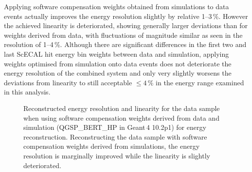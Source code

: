 \documentclass[twoside,a4paper,12pt]{article}
\begin{document}
Applying software compensation weights obtained from simulations to data events actually improves the energy resolution slightly by relative 1--3\,\%. However the achieved linearity is deteriorated, showing generally larger deviations than for weights derived from data, with fluctuations of magnitude similar as seen in the resolution of 1--4\,\%. Although there are significant differences in the first two and last ScECAL hit energy bin weights between data and simulation, applying weights optimised from simulation onto data events does not deteriorate the energy resolution of the combined system and only very slightly worsens the deviations from linearity to still acceptable $\leq 4\,\%$ in the energy range examined in this analysis.
\begin{figure}[htbp]
\begin{center}
	\hfill
\end{center}
	\caption{Reconstructed energy resolution and linearity for the data sample when using software compensation weights derived from data and simulation (QGSP\_BERT\_HP in Geant\,4 10.2p1) for energy reconstruction. Reconstructing the data sample with software compensation weights derived from simulations, the energy resolution is marginally improved while the linearity is slightly deteriorated.}
	\label{fig:pion_data_mc_weights}
\end{figure}
\end{document}

